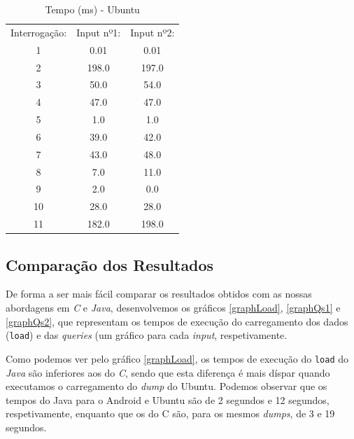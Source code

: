 \documentclass[a4paper, 11pt, oneside]{article}
\begin{document}
\begin{table}[h] 
	\centering
	\caption{Tempo (ms) - Ubuntu}	
	\begin{tabular}{c|c|c}
	Interrogação: & Input nº1:      & Input nº2:      \\
	1             & 0.01            & 0.01            \\
	2             & 198.0           & 197.0           \\
	3             & 50.0            & 54.0            \\
	4             & 47.0            & 47.0            \\
	5             & 1.0             & 1.0             \\
	6             & 39.0            & 42.0            \\
	7             & 43.0            & 48.0            \\
	8             & 7.0             & 11.0            \\
	9             & 2.0             & 0.0             \\
	10            & 28.0            & 28.0            \\
	11            & 182.0           & 198.0  
	\end{tabular}
\end{table}



\subsection{Comparação dos Resultados}

De forma a ser mais fácil comparar os resultados obtidos com as nossas abordagens em \textit{C} e \textit{Java},
desenvolvemos os gráficos \ref{graphLoad}, \ref{graphQs1} e \ref{graphQs2}, que representam os tempos de execução do carregamento dos dados (\texttt{load}) e das \textit{queries} (um gráfico para cada \textit{input}, respetivamente.


Como podemos ver pelo gráfico \ref{graphLoad}, os tempos de execução do \texttt{load} do \textit{Java} são inferiores aos do \textit{C}, sendo que esta diferença é mais díspar quando executamos o carregamento do \textit{dump} do Ubuntu. Podemos observar que os tempos do Java para o Android e Ubuntu são de 2 segundos e 12 segundos, respetivamente, enquanto que os do C são, para os mesmos \textit{dumps}, de 3 e 19 segundos.
\end{document}
